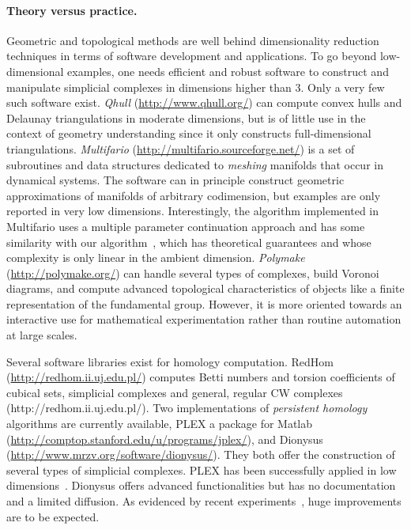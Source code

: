 \paragraph{Theory versus practice.} 
Geometric and topological methods are well behind dimensionality reduction techniques in terms of 
software development and applications.  
%
%
To go beyond low-dimensional examples, one needs efficient and robust software to construct and manipulate simplicial complexes in dimensions higher than 3.  Only a very few such software exist.  {\em Qhull} (\url{http://www.qhull.org/}{}) can compute convex hulls and Delaunay triangulations in moderate dimensions, but is of little use in the context of geometry understanding since it only constructs full-dimensional triangulations. {\em Multifario} (\url{http://multifario.sourceforge.net/}{}) is a set of subroutines and data structures dedicated to {\em meshing} manifolds that occur in dynamical systems. The software can in principle construct geometric approximations of manifolds of arbitrary codimension, but examples are only reported in very low dimensions. Interestingly, the algorithm implemented in Multifario  uses a multiple parameter continuation approach and has some similarity with our algorithm~\cite{boissonnat2010meshing}, which has theoretical guarantees and whose complexity is only linear in the ambient dimension.  {\em Polymake} (\url{http://polymake.org/}{}) can handle several types of complexes, build Voronoi diagrams, and compute advanced topological characteristics of objects like a finite representation of the fundamental group. However, it is more oriented towards an interactive use for mathematical experimentation
rather than  routine automation at large scales.%

Several software libraries exist for homology computation. RedHom (\url{http://redhom.ii.uj.edu.pl/}{}) computes Betti numbers and torsion coefficients of cubical sets, simplicial complexes and general, regular CW complexes (http://redhom.ii.uj.edu.pl/).
Two implementations of {\em persistent homology} algorithms are currently available, PLEX a package for Matlab (\url{http://comptop.stanford.edu/u/programs/jplex/}{}), and  Dionysus (\url{http://www.mrzv.org/software/dionysus/}{}). They both offer the construction of several types of simplicial complexes. PLEX has been  successfully applied in low dimensions~\cite{fpgo-airc-2009,rg-bptd-2008}. Dionysus offers advanced
functionalities but has no documentation and a limited diffusion. As evidenced by recent experiments~\cite{bm-dssc-2012}, huge improvements are to be expected.
\vspace{2mm}

